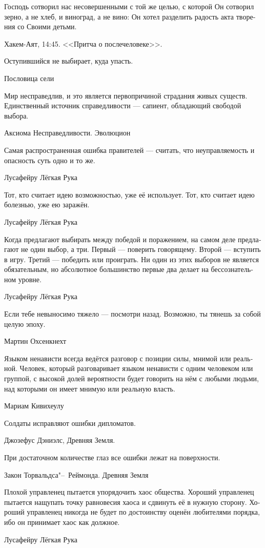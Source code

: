 \documentclass[a4paper,12pt,fleqn]{book}\usepackage{polyglossia}\setdefaultlanguage[babelshorthands=true]{russian}\setotherlanguage{english}\defaultfontfeatures{Ligatures=TeX,Mapping=tex-text}\usepackage{xcolor}\newcommand{\ml}[3]{#2}
\begin{document}
{\epigraph
{Господь сотворил нас несовершенными с той же целью, с которой Он сотворил зерно, а не хлеб, и виноград, а не вино: Он хотел разделить радость акта творения со Своими детьми.}
{Хакем-Аят, 14:45.
<<Притча о послечеловеке>>.}

\epigraph{
\ml{$0$}
{Оступившийся не выбирает, куда упасть.}
{A tripped one can't choose the place to fall.}
}{Пословица сели}

\epigraph
{Мир несправедлив, и это является первопричиной страдания живых существ.
Единственный источник справедливости --- сапиент, обладающий свободой выбора.}
{Аксиома Несправедливости. Эволюцион}

\epigraph
{Самая распространенная ошибка правителей --- считать, что неуправляемость и опасность суть одно и то же.}
{Лусафейру Лёгкая Рука}

\epigraph{
\ml{$0$}
{Тот, кто считает идею возможностью, уже её использует.}
{The one who treats an idea as an opportunity, already uses it.}
\ml{$0$}
{Тот, кто считает идею болезнью, уже ею заражён.}
{The one who treats an idea as a disease, is already infected.}
}{Лусафейру Лёгкая Рука}

\epigraph
{Когда предлагают выбирать между победой и поражением, на самом деле предлагают не один выбор, а три.
Первый --- поверить говорящему.
Второй --- вступить в игру.
Третий --- победить или проиграть.
Ни один из этих выборов не является обязательным, но абсолютное большинство первые два делает на бессознательном уровне.}
{Лусафейру Лёгкая Рука}

\epigraph
{Если тебе невыносимо тяжело --- посмотри назад.
Возможно, ты тянешь за собой целую эпоху.}
{Мартин Охсенкнехт}

\epigraph
{Языком ненависти всегда ведётся разговор с позиции силы, мнимой или реальной.
Человек, который разговаривает языком ненависти с одним человеком или группой, с высокой долей вероятности будет говорить на нём с любыми людьми, над которыми он имеет мнимую или реальную власть.}
{Мариам Кивихеулу}

\epigraph
{Солдаты исправляют ошибки дипломатов.}
{Джозефус Дэниэлс, Древняя Земля.}

\epigraph
{При достаточном количестве глаз все ошибки лежат на поверхности.}
{Закон Торвальдса"--~Реймонда. Древняя Земля}

\epigraph
{Плохой управленец пытается упорядочить хаос общества.
Хороший управленец пытается нащупать точку равновесия хаоса и сдвинуть её в нужную сторону.
Хороший управленец никогда не будет по достоинству оценён любителями порядка, ибо он принимает хаос как должное.}
{Лусафейру Лёгкая Рука}

}
\end{document}
